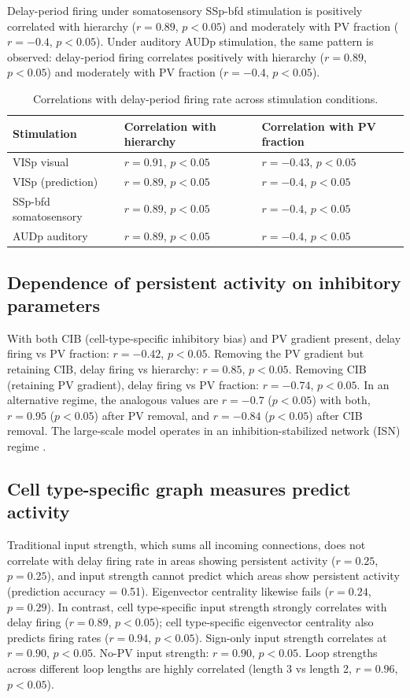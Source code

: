 \documentclass[11pt]{article}
\begin{document}
Delay-period firing under somatosensory SSp-bfd stimulation is positively correlated with hierarchy ($r = 0.89$, $p < 0.05$) and moderately with PV fraction ($r = -0.4$, $p < 0.05$). Under auditory AUDp stimulation, the same pattern is observed: delay-period firing correlates positively with hierarchy ($r = 0.89$, $p < 0.05$) and moderately with PV fraction ($r = -0.4$, $p < 0.05$).

\begin{table}[h]
\centering
\caption{Correlations with delay-period firing rate across stimulation conditions.}
\begin{tabular}{lll}
\toprule
Stimulation & Correlation with hierarchy & Correlation with PV fraction \\
\midrule
VISp visual & $r = 0.91$, $p < 0.05$ & $r = -0.43$, $p < 0.05$ \\
VISp (prediction) & $r = 0.89$, $p < 0.05$ & $r = -0.4$, $p < 0.05$ \\
SSp-bfd somatosensory & $r = 0.89$, $p < 0.05$ & $r = -0.4$, $p < 0.05$ \\
AUDp auditory & $r = 0.89$, $p < 0.05$ & $r = -0.4$, $p < 0.05$ \\
\bottomrule
\end{tabular}
\end{table}

\subsection{Dependence of persistent activity on inhibitory parameters}
With both CIB (cell-type-specific inhibitory bias) and PV gradient present, delay firing vs PV fraction: $r = -0.42$, $p < 0.05$. Removing the PV gradient but retaining CIB, delay firing vs hierarchy: $r = 0.85$, $p < 0.05$. Removing CIB (retaining PV gradient), delay firing vs PV fraction: $r = -0.74$, $p < 0.05$. In an alternative regime, the analogous values are $r = -0.7$ ($p < 0.05$) with both, $r = 0.95$ ($p < 0.05$) after PV removal, and $r = -0.84$ ($p < 0.05$) after CIB removal. The large-scale model operates in an inhibition-stabilized network (ISN) regime \cite{tsodyks1997paradoxical,sanzeni2020inhibition}.

\subsection{Cell type-specific graph measures predict activity}
Traditional input strength, which sums all incoming connections, does not correlate with delay firing rate in areas showing persistent activity ($r = 0.25$, $p = 0.25$), and input strength cannot predict which areas show persistent activity (prediction accuracy = 0.51). Eigenvector centrality likewise fails ($r = 0.24$, $p = 0.29$). In contrast, cell type-specific input strength strongly correlates with delay firing ($r = 0.89$, $p < 0.05$); cell type-specific eigenvector centrality also predicts firing rates ($r = 0.94$, $p < 0.05$). Sign-only input strength correlates at $r = 0.90$, $p < 0.05$. No-PV input strength: $r = 0.90$, $p < 0.05$. Loop strengths across different loop lengths are highly correlated (length 3 vs length 2, $r = 0.96$, $p < 0.05$).
\end{document}
